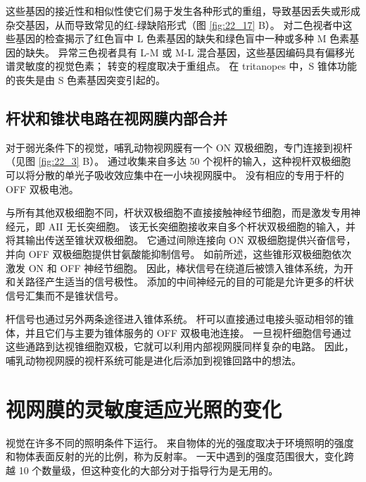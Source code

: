 这些基因的接近性和相似性使它们易于发生各种形式的重组，导致基因丢失或形成杂交基因，从而导致常见的红-绿缺陷形式（图 \ref{fig:22_17} B）。 
对二色视者中这些基因的检查揭示了红色盲中 L 色素基因的缺失和绿色盲中一种或多种 M 色素基因的缺失。 
异常三色视者具有 L-M 或 M-L 混合基因，这些基因编码具有偏移光谱灵敏度的视觉色素； 转变的程度取决于重组点。 
在 tritanopes 中，S 锥体功能的丧失是由 S 色素基因突变引起的。


\subsection{杆状和锥状电路在视网膜内部合并}
对于弱光条件下的视觉，哺乳动物视网膜有一个 ON 双极细胞，专门连接到视杆（见图 \ref{fig:22_3} B）。 
通过收集来自多达 50 个视杆的输入，这种视杆双极细胞可以将分散的单光子吸收效应集中在一小块视网膜中。 
没有相应的专用于杆的 OFF 双极电池。


与所有其他双极细胞不同，杆状双极细胞不直接接触神经节细胞，而是激发专用神经元，即 AII 无长突细胞。 
该无长突细胞接收来自多个杆状双极细胞的输入，并将其输出传送至锥状双极细胞。 
它通过间隙连接向 ON 双极细胞提供兴奋信号，并向 OFF 双极细胞提供甘氨酸能抑制信号。 
如前所述，这些锥形双极细胞依次激发 ON 和 OFF 神经节细胞。 
因此，棒状信号在绕道后被馈入锥体系统，为开和关路径产生适当的信号极性。 
添加的中间神经元的目的可能是允许更多的杆状信号汇集而不是锥状信号。


杆信号也通过另外两条途径进入锥体系统。 
杆可以直接通过电接头驱动相邻的锥体，并且它们与主要为锥体服务的 OFF 双极电池连接。 
一旦视杆细胞信号通过这些通路到达视锥细胞双极，它就可以利用内部视网膜同样复杂的电路。 
因此，哺乳动物视网膜的视杆系统可能是进化后添加到视锥回路中的想法。



\section{视网膜的灵敏度适应光照的变化}
视觉在许多不同的照明条件下运行。 
来自物体的光的强度取决于环境照明的强度和物体表面反射的光的比例，称为反射率。 
一天中遇到的强度范围很大，变化跨越 10 个数量级，但这种变化的大部分对于指导行为是无用的。


